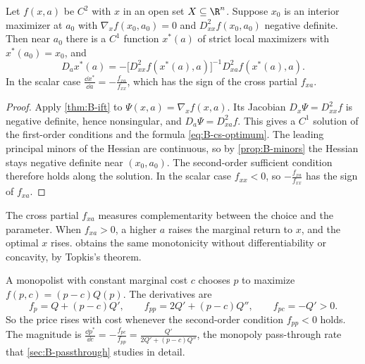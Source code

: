 \begin{proposition}\label{prop:B-cs-optimum}
Let $f(x, a)$ be $C^2$ with $x$ in an open set $X \subseteq \R^n$. Suppose $x_0$ is an interior maximizer at $a_0$ with
$\nabla_x f(x_0, a_0) = 0$ and $D^2_{xx}f(x_0, a_0)$ negative definite. Then near $a_0$ there is a $C^1$ function
$x^*(a)$ of strict local maximizers with $x^*(a_0) = x_0$, and
\begin{equation}\label{eq:B-cs-optimum}
D_a x^*(a) = -\big[D^2_{xx}f(x^*(a), a)\big]^{-1}D^2_{xa}f(x^*(a), a) .
\end{equation}
In the scalar case $\frac{\dd x^*}{\dd a} = -\frac{f_{xa}}{f_{xx}}$, which has the sign of the cross partial $f_{xa}$.
\end{proposition}

\begin{proof}
Apply \cref{thm:B-ift} to $\Psi(x, a) = \nabla_x f(x, a)$. Its Jacobian $D_x\Psi = D^2_{xx}f$ is negative definite, hence
nonsingular, and $D_a\Psi = D^2_{xa}f$. This gives a $C^1$ solution of the first-order conditions and the formula
\eqref{eq:B-cs-optimum}. The leading principal minors of the Hessian are continuous, so by \cref{prop:B-minors} the
Hessian stays negative definite near $(x_0, a_0)$. The second-order sufficient condition therefore holds along the
solution. In the scalar case $f_{xx} < 0$, so $-\frac{f_{xa}}{f_{xx}}$ has the sign of $f_{xa}$.
\end{proof}

The cross partial $f_{xa}$ measures complementarity between the choice and the parameter. When $f_{xa} > 0$, a
higher $a$ raises the marginal return to $x$, and the optimal $x$ rises.  obtains the same
monotonicity without differentiability or concavity, by Topkis's theorem.

\begin{example}\label{ex:B-monopoly-cs}
A monopolist with constant marginal cost $c$ chooses $p$ to maximize $f(p, c) = (p - c)Q(p)$. The derivatives are
\begin{equation*}
f_p = Q + (p - c)Q' , \qquad f_{pp} = 2Q' + (p - c)Q'' , \qquad f_{pc} = -Q' > 0 .
\end{equation*}
So the price rises with cost whenever the second-order condition $f_{pp} < 0$ holds. The magnitude is
$\frac{\dd p^*}{\dd c} = -\frac{f_{pc}}{f_{pp}} = \frac{Q'}{2Q' + (p - c)Q''}$, the monopoly pass-through rate that
\cref{sec:B-passthrough} studies in detail.
\end{example}

